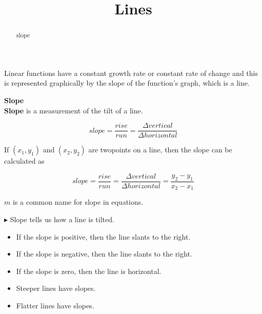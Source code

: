 \documentclass{ximera}
\title{Lines}
\begin{document}
\begin{abstract}
slope
\end{abstract}
\maketitle



Linear functions have a constant growth rate or constant rate of change and this is represented graphically by the slope of the function's graph, which is a line.


\begin{definition} \textbf{\textcolor{green!50!black}{Slope}} \\


\textbf{Slope} is a measurement of the tilt of a line.


\[
slope = \frac{rise}{run} = \frac{\Delta vertical}{\Delta horizontal}
\]


If $(x_1, y_1)$ and $(x_2, y_2)$ are twopoints on a line, then the slope can be calculated as

\[
slope = \frac{rise}{run} = \frac{\Delta vertical}{\Delta horizontal} = \frac{y_2 - y_1}{x_2 - x_1}
\]



\end{definition}


$m$ is a common name for slope in equations.




\begin{observation}

$\blacktriangleright$ Slope tells us how a line is tilted.


\begin{itemize}
\item If the slope is positive, then the line slants   to the right.
\item If the slope is negative, then the line slants   to the right.
\item If the slope is zero, then the line is horizontal.
\end{itemize}


\begin{itemize}
\item Steeper lines have  slopes.
\item Flatter lines have  slopes.
\end{itemize}

\end{observation}
\end{document}
